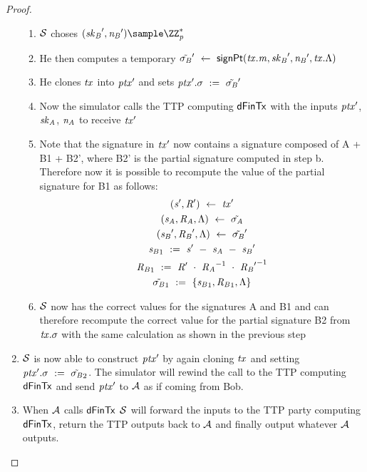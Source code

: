\begin{proof}
\begin{enumerate}
        \begin{enumerate}
            \item $\mathcal{S}$ choses $(\funStarAlt{\varSecKeyBob}, \funStarAlt{\varNonceBob}) \sample \cnstIntegersPrimeWithoutZero{\varPrime}$
            \item He then computes a temporary ${\tilde{\sigma_{\mathit{B}}}}' ~\leftarrow~ \mathsf{signPt}(\mathit{tx}.\mathit{m}, {\mathit{sk}_{\mathit{B}}}', {\mathit{\mathit{n}_{\mathit{B}}}}', \mathit{tx}.\Lambda)$
            \item He clones $\mathit{tx}$ into ${\mathit{ptx}}'$ and sets ${\mathit{ptx}}'.\sigma ~:=~ {\tilde{\sigma_{\mathit{B}}}}'$
            \item Now the simulator calls the TTP computing $\mathsf{dFinTx}$ with the inputs ${\mathit{ptx}}'$, $\mathit{sk}_{\mathit{A}}$, $\mathit{\mathit{n}_{\mathit{A}}}$ to receive ${\mathit{tx}}'$
            \item Note that the signature in ${\mathit{tx}}'$ now contains a signature composed of A + B1 + B2', where B2' is the partial signature computed in step b.
            Therefore now it is possible to recompute the value of the partial signature for B1 as follows:
            \begin{gather*}
                ({\mathit{s}}', {\mathit{R}}') ~\leftarrow~ {\mathit{tx}}' \\
                (\mathit{s}_{\mathit{A}}, \mathit{R}_{\mathit{A}}, \Lambda) ~\leftarrow~ \tilde{\sigma_{\mathit{A}}} \\
                ({\mathit{s}_{\mathit{B}}}', {\mathit{R}_{\mathit{B}}}', \Lambda) ~\leftarrow~ {\tilde{\sigma_{\mathit{B}}}}' \\
                {\mathit{s}_{\mathit{B}}}_1 ~:=~ {\mathit{s}}' ~-~ \mathit{s}_{\mathit{A}} ~-~ {\mathit{s}_{\mathit{B}}}' \\
                {\mathit{R}_{\mathit{B}}}_1 ~:=~ {\mathit{R}}' ~\cdot~ {\mathit{R}_{\mathit{A}}}^{-1} ~\cdot~ {{\mathit{R}_{\mathit{B}}}'}^{-1} \\
                {\tilde{\sigma_{\mathit{B}}}}_1 ~:=~ \{ {\mathit{s}_{\mathit{B}}}_1, {\mathit{R}_{\mathit{B}}}_1, \Lambda \}
            \end{gather*}
            \item $\mathcal{S}$ now has the correct values for the signatures A and B1 and can therefore recompute the correct value for the partial signature B2 from $\mathit{tx}.\sigma$ with the same calculation as shown in the previous step
        \end{enumerate}
        \item $\mathcal{S}$ is now able to construct ${\mathit{ptx}}'$ by again cloning $\mathit{tx}$ and setting ${\mathit{ptx}}'.\sigma ~:=~ {\tilde{\sigma_{\mathit{B}}}}_2$.
        The simulator will rewind the call to the TTP computing $\mathsf{dFinTx}$ and send ${\mathit{ptx}}'$ to $\mathcal{A}$ as if coming from Bob.
        \item When $\mathcal{A}$ calls $\mathsf{dFinTx}$ $\mathcal{S}$ will forward the inputs to the TTP party computing $\mathsf{dFinTx}$, return the TTP outputs back to $\mathcal{A}$ and finally output whatever $\mathcal{A}$ outputs.
    \end{enumerate}


\end{proof}
